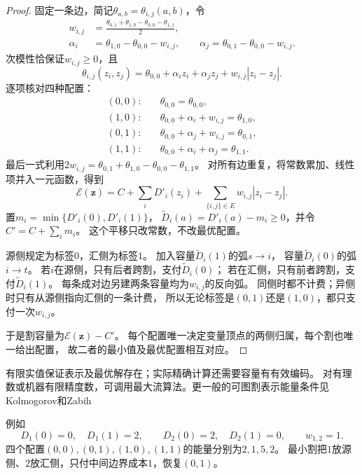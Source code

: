\begin{proof}
固定一条边，简记\(\theta_{a,b}=\theta_{i,j}(a,b)\)，令
\begin{align}
  w_{i,j}
  &=\frac{\theta_{0,1}+\theta_{1,0}-\theta_{0,0}-\theta_{1,1}}2,
  \label{eq:graph-theory-cut-pair-weight}\\
  \alpha_i&=\theta_{1,0}-\theta_{0,0}-w_{i,j},\qquad
  \alpha_j=\theta_{0,1}-\theta_{0,0}-w_{i,j}.
  \label{eq:graph-theory-cut-unary-shifts}
\end{align}
次模性恰保证\(w_{i,j}\geq0\)，且
\begin{equation}
  \theta_{i,j}(z_i,z_j)=\theta_{0,0}+\alpha_i z_i+\alpha_j z_j
  +w_{i,j}|z_i-z_j|.
  \label{eq:graph-theory-pairwise-cut-decomposition}
\end{equation}
逐项核对四种配置：
\begin{align*}
  (0,0):\quad&\theta_{0,0}=\theta_{0,0},\\
  (1,0):\quad&\theta_{0,0}+\alpha_i+w_{i,j}=\theta_{1,0},\\
  (0,1):\quad&\theta_{0,0}+\alpha_j+w_{i,j}=\theta_{0,1},\\
  (1,1):\quad&\theta_{0,0}+\alpha_i+\alpha_j=\theta_{1,1}.
\end{align*}
最后一式利用\(2w_{i,j}=\theta_{0,1}+\theta_{1,0}-\theta_{0,0}-\theta_{1,1}\)。
对所有边重复，将常数累加、线性项并入一元函数，得到
\[
  \mathcal E(\bm z)=C+\sum_iD'_i(z_i)
    +\sum_{\{i,j\}\in E}w_{i,j}|z_i-z_j|.
\]
置\(m_i=\min\{D'_i(0),D'_i(1)\}\)，
\(\widetilde D_i(a)=D'_i(a)-m_i\geq0\)，并令\(C'=C+\sum_i m_i\)。
这个平移只改常数，不改最优配置。

源侧规定为标签\(0\)，汇侧为标签\(1\)。
加入容量\(\widetilde D_i(1)\)的弧\(s\to i\)，
容量\(\widetilde D_i(0)\)的弧\(i\to t\)。
若\(i\)在源侧，只有后者跨割，支付\(\widetilde D_i(0)\)；
若在汇侧，只有前者跨割，支付\(\widetilde D_i(1)\)。
每条成对边另建两条容量均为\(w_{i,j}\)的反向弧。
同侧时都不计费；异侧时只有从源侧指向汇侧的一条计费，
所以无论标签是\((0,1)\)还是\((1,0)\)，都只支付一次\(w_{i,j}\)。

于是割容量为\(\mathcal E(\bm z)-C'\)。
每个配置唯一决定变量顶点的两侧归属，每个割也唯一给出配置，
故二者的最小值及最优配置相互对应。
\end{proof}

有限实值保证表示及最优解存在；实际精确计算还需要容量有有效编码。
对有理数或机器有限精度数，可调用最大流算法。更一般的可图割表示能量条件见
Kolmogorov和Zabih

例如
\[
  D_1(0)=0,\quad D_1(1)=2,\qquad
  D_2(0)=2,\quad D_2(1)=0,\qquad w_{1,2}=1.
\]
四个配置\((0,0),(0,1),(1,0),(1,1)\)的能量分别为\(2,1,5,2\)。
最小割把\(1\)放源侧、\(2\)放汇侧，只付中间边界成本\(1\)，恢复\((0,1)\)。

